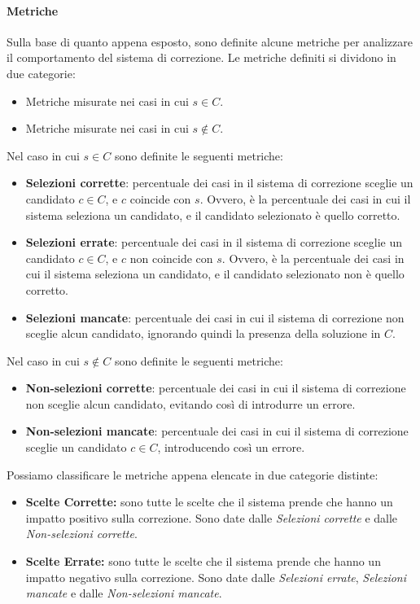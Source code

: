 \paragraph{Metriche}
Sulla base di quanto appena esposto, sono definite alcune metriche per analizzare il comportamento del sistema di correzione. Le metriche definiti si dividono in due categorie:
\begin{itemize}
\item Metriche misurate nei casi in cui $s \in C$.
\item Metriche misurate nei casi in cui $s \not\in C$.
\end{itemize}
Nel caso in cui $s \in C$ sono definite le seguenti metriche:
\begin{itemize}
\item \textbf{Selezioni corrette}: percentuale dei casi in il sistema di correzione sceglie un candidato $c \in C$, e $c$ coincide con $s$. Ovvero, è la percentuale dei casi in cui il sistema seleziona un candidato, e il candidato selezionato è quello corretto.

\item \textbf{Selezioni errate}: percentuale dei casi in il sistema di correzione sceglie un candidato $c \in C$, e $c$ non coincide con $s$. Ovvero, è la percentuale dei casi in cui il sistema seleziona un candidato, e il candidato selezionato non è quello corretto.

\item \textbf{Selezioni mancate}: percentuale dei casi in cui il sistema di correzione non sceglie alcun candidato, ignorando quindi la presenza della soluzione in $C$.

\end{itemize}

\noindent
Nel caso in cui $s \not\in C$ sono definite le seguenti metriche:
\begin{itemize}
\item \textbf{Non-selezioni corrette}: percentuale dei casi in cui il sistema di correzione non sceglie alcun candidato, evitando così di introdurre un errore.

\item \textbf{Non-selezioni mancate}: percentuale dei casi in cui il sistema di correzione sceglie un candidato $c\in C$, introducendo così un errore.
\end{itemize}

\noindent
Possiamo classificare le metriche appena elencate in due categorie distinte:
\begin{itemize}
\item \textbf{Scelte Corrette:} sono tutte le scelte che il sistema prende che hanno un impatto positivo sulla correzione. Sono date dalle \textit{Selezioni corrette} e dalle \textit{Non-selezioni corrette}.

\item \textbf{Scelte Errate:} sono tutte le scelte che il sistema prende che hanno un impatto negativo sulla correzione. Sono date dalle \textit{Selezioni errate}, \textit{Selezioni mancate} e dalle \textit{Non-selezioni mancate}.
\end{itemize}

